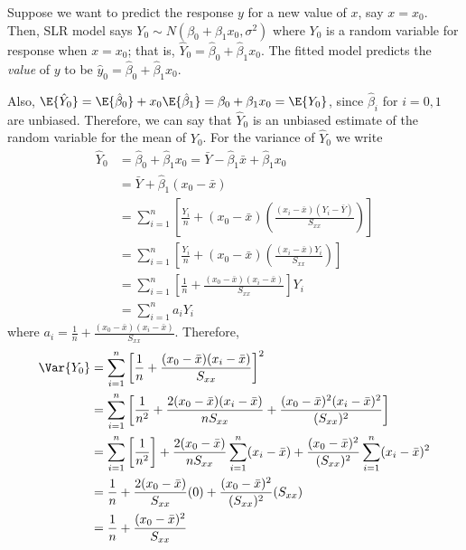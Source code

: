 Suppose we want to predict the response $ y $
for a new value of $ x $, say $ x=x_0 $. Then,
SLR model says
$ Y_0 \sim N(\beta_0+\beta_1 x_0,\sigma^2) $
where $ Y_0 $ is a random variable for response when $ x=x_0 $;
that is, $ \hat{Y}_0=\hat{\beta}_0+\hat{\beta}_1x_0 $.
The fitted model predicts the \emph{value} of $ y $
to be $ \hat{y}_0=\hat{\beta}_0+\hat{\beta}_1x_0 $.

Also, $\E{\hat{Y}_0}=\E{\hat{\beta}_0}+x_0\E{\hat{\beta}_1}=
    \beta_0+\beta_1x_0=\E{Y_0} $,
since $ \hat{\beta}_i $ for $ i=0,1 $ are unbiased.
Therefore, we can say that $ \hat{Y}_0 $ is an unbiased estimate
of the random variable for the mean of $ Y_0 $. For the variance
of $ \hat{Y}_0 $ we write
\begin{align*}
    \hat{Y}_0
     & =
    \hat{\beta}_0+\hat{\beta}_1x_0=\bar{Y}-\hat{\beta}_1\bar{x}+
    \hat{\beta}_1x_0                                                                         \\
     & =\bar{Y}+\hat{\beta}_1(x_0-\bar{x})                                                   \\
     & =\sum_{i=1}^{n} \left[ \frac{Y_i}{n} +(x_0-\bar{x})
    \left( \frac{(x_i-\bar{x})(Y_i-\bar{Y})}{S_{xx}} \right)  \right]                        \\
     & =\sum_{i=1}^{n} \left[ \frac{Y_i}{n} +(x_0-\bar{x})
    \left( \frac{(x_i-\bar{x})Y_i}{S_{xx}} \right)  \right]                                  \\
     & =\sum_{i=1}^{n} \left[ \frac{1}{n} +\frac{(x_0-\bar{x})(x_i-\bar{x})}{S_{xx}} \right]
    Y_i                                                                                      \\
     & =\sum_{i=1}^{n} a_i Y_i
\end{align*}
where $ \displaystyle  a_i=\frac{1}{n} +\frac{(x_0-\bar{x})(x_i-\bar{x})}{S_{xx}} $.
Therefore,
\begin{align*}
    \Var{Y_0}
     & =\sum_{i=1}^{n} \left[ \frac{1}{n} +
    \frac{(x_0-\bar{x})(x_i-\bar{x})}{S_{xx}} \right]^2                \\
     & = \sum_{i=1}^{n} \left[ \frac{1}{n^2}+
        \frac{2(x_0-\bar{x})(x_i-\bar{x})}{nS_{xx}}+
    \frac{(x_0-\bar{x})^2(x_i-\bar{x})^2}{(S_{xx})^2}  \right]         \\
     & =\sum_{i=1}^{n} \left[ \frac{1}{n^2}  \right]+
    \frac{2(x_0-\bar{x})}{n S_{xx}}\sum_{i=1}^{n} (x_i-\bar{x})
    +\frac{(x_0-\bar{x})^2}{(S_{xx})^2} \sum_{i=1}^{n} (x_i-\bar{x})^2 \\
     & =\frac{1}{n} +\frac{2(x_0-\bar{x})}{S_{xx}}(0)+
    \frac{(x_0-\bar{x})^2}{(S_{xx})^2}(S_{xx})                         \\
     & =\frac{1}{n}+\frac{(x_0-\bar{x})^2}{S_{xx}}
\end{align*}
